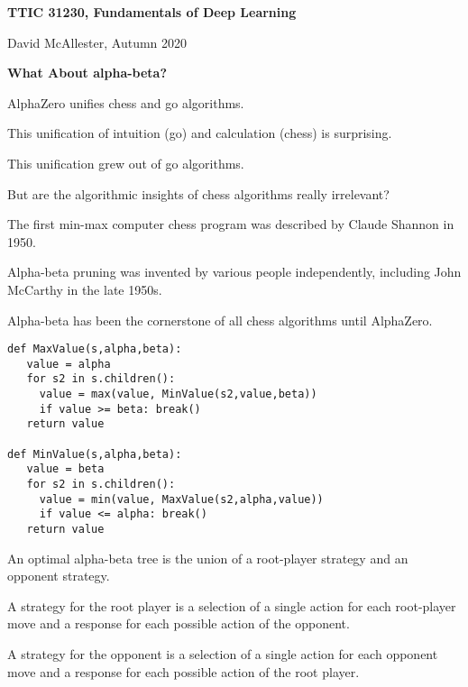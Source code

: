 




{\Huge

  \centerline{\bf TTIC 31230, Fundamentals of Deep Learning}
  \bigskip
  \centerline{David McAllester, Autumn 2020}

  \vfill
  \centerline{\bf What About alpha-beta?}
  \vfill
  \vfill


AlphaZero unifies chess and go algorithms.

\vfill
This unification of intuition (go) and calculation (chess) is surprising.

\vfill
This unification grew out of go algorithms.

\vfill
But are the algorithmic insights of chess algorithms really irrelevant?


The first min-max computer chess program was described by Claude Shannon in 1950.

\vfill
Alpha-beta pruning was invented by various people independently, including John McCarthy in the late 1950s.

\vfill
Alpha-beta has been the cornerstone of all chess algorithms until AlphaZero.



\begin{verbatim}
def MaxValue(s,alpha,beta):
   value = alpha
   for s2 in s.children():
     value = max(value, MinValue(s2,value,beta))
     if value >= beta: break()
   return value

def MinValue(s,alpha,beta):
   value = beta
   for s2 in s.children():
     value = min(value, MaxValue(s2,alpha,value))
     if value <= alpha: break()
   return value
\end{verbatim}



An optimal alpha-beta tree is the union of a root-player strategy and an opponent strategy.

\vfill
A strategy for the root player is a selection of a single action for each root-player move and a response for each possible action
of the opponent.

\vfill
A strategy for the opponent is a selection of a single action for each opponent move and a response for each possible action
of the root player.


}
